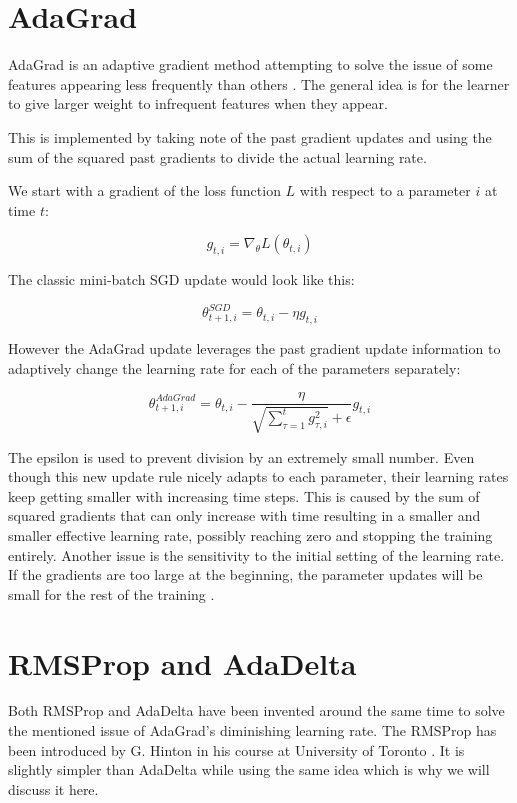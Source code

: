 \documentclass[12pt, titlepage]{article}
\begin{document}
\section{AdaGrad}
AdaGrad is an adaptive gradient method attempting to solve the issue of some features appearing less frequently than others \cite{duchi2011adaptive}. The general idea is for the learner to give larger weight to infrequent features when they appear. 

This is implemented by taking note of the past gradient updates and using the sum of the squared past gradients to divide the actual learning rate. 

We start with a gradient of the loss function $L$ with respect to a parameter $i$ at time $t$:

\begin{equation}\label{eq:gradient}
g_{t,i} = \nabla_{\theta} L(\theta_{t,i})
\end{equation}

The classic mini-batch SGD update would look like this:

\begin{equation}\label{eq:sqd_update}
\theta_{t+1,i}^{SGD} = \theta_{t,i} - \eta g_{t,i}
\end{equation}

However the AdaGrad update leverages the past gradient update information to adaptively change the learning rate for each of the parameters separately:

\begin{equation}\label{eq:adagrad_update}
\theta_{t+1,i}^{AdaGrad} = \theta_{t,i} - \frac{\eta}{\sqrt{ \sum_{\tau=1}^t{g_{\tau,i}^2}} + \epsilon} g_{t,i}
\end{equation}

The epsilon is used to prevent division by an extremely small number. Even though this new update rule nicely adapts to each parameter, their learning rates keep getting smaller with increasing time steps. This is caused by the sum of squared gradients that can only increase with time resulting in a smaller and smaller effective learning rate, possibly reaching zero and stopping the training entirely. Another issue is the sensitivity to the initial setting of the learning rate. If the gradients are too large at the beginning, the parameter updates will be small for the rest of the training \cite{zeiler2012adadelta}.


\section{RMSProp and AdaDelta}
Both RMSProp and AdaDelta have been invented around the same time to solve the mentioned issue of AdaGrad's diminishing learning rate. The RMSProp has been introduced by G. Hinton in his course at University of Toronto \cite{rmsprop}. It is slightly simpler than AdaDelta \cite{zeiler2012adadelta} while using the same idea which is why we will discuss it here.
\end{document}

